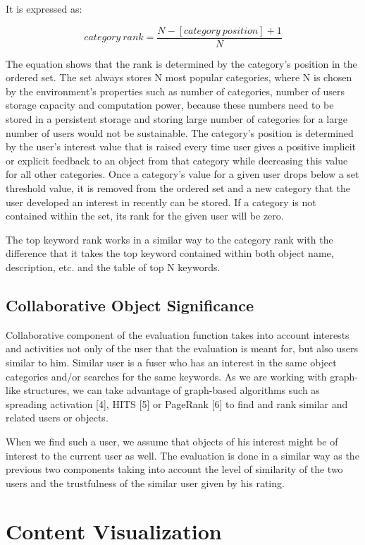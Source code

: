 \documentclass[10pt]{article}
\begin{document}
It is expressed as:

$$category~rank=\frac{N-[category~position]+1}{N}$$


The equation shows that the rank is determined by the category’s position in the ordered set. The set always stores N most popular categories, where N is chosen by the environment’s properties such as number of categories, number of users storage capacity and computation power, because these numbers need to be stored in a persistent storage and storing large number of categories for a large number of users would not be sustainable. The category’s position is determined by the user’s interest value that is raised every time user gives a positive implicit or explicit feedback to an object from that category while decreasing this value for all other categories. Once a category’s value for a given user drops below a set threshold value, it is removed from the ordered set and a new category that the user developed an interest in recently can be stored. If a category is not contained within the set, its rank for the given user will be zero.

The top keyword rank works in a similar way to the category rank with the difference that it takes the top keyword contained within both object name, description, etc. and the table of top N keywords.

\subsection{Collaborative Object Significance}

Collaborative component of the evaluation function takes into account interests and activities not only of the user that the evaluation is meant for, but also users similar to him. Similar user is a fuser who has an interest in the same object categories and/or searches for the same keywords. As we are working with graph-like structures, we can take advantage of graph-based algorithms such as spreading activation [4], HITS [5] or PageRank [6] to find and rank similar and related users or objects.

When we find such a user, we assume that objects of his interest might be of interest to the current user as well. The evaluation is done in a similar way as the previous two components taking into account the level of similarity of the two users and the trustfulness of the similar user given by his rating.
\section{Content Visualization}
\label{3}
\end{document}
